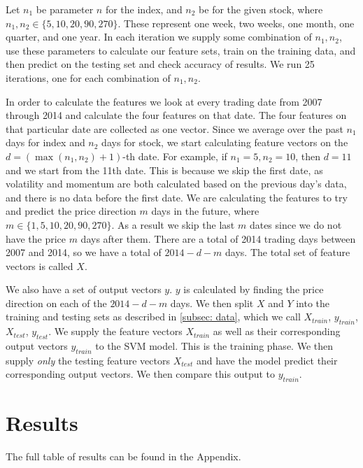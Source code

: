 \documentclass[pageno]{jpaper}
\begin{document}
Let $n_1$ be parameter $n$ for the index, and $n_2$ be for the given stock, where $n_1, n_2 \in \{5, 10, 20, 90, 270\}$. These represent one week, two weeks, one month, one quarter, and one year. In each iteration we supply some combination of $n_1, n_2$, use these parameters to calculate our feature sets, train on the training data, and then predict on the testing set and check accuracy of results. We run 25 iterations, one for each combination of $n_1, n_2$.

In order to calculate the features we look at every trading date from 2007 through 2014 and calculate the four features on that date. The four features on that particular date are collected as one vector. Since we average over the past $n_1$ days for index and $n_2$ days for stock, we start calculating feature vectors on the $d = (\max(n_1, n_2) + 1)$-th date. For example, if $n_1 = 5, n_2 = 10$, then $d=11$ and we start from the 11th date. This is because we skip the first date, as volatility and momentum are both calculated based on the previous day's data, and there is no data before the first date. We are calculating the features to try and predict the price direction $m$ days in the future, where $m \in \{1, 5, 10, 20, 90, 270\}$. As a result we skip the last $m$ dates since we do not have the price $m$ days after them. There are a total of 2014 trading days between 2007 and 2014, so we have a total of $2014 - d - m$ days. The total set of feature vectors is called $X$.

We also have a set of output vectors $y$. $y$ is calculated by finding the price direction on each of the $2014-d-m$ days. We then split $X$ and $Y$ into the training and testing sets as described in \ref{subsec: data}, which we call $X_{train}$, $y_{train}$, $X_{test}$, $y_{test}$. We supply the feature vectors $X_{train}$ as well as their corresponding output vectors $y_{train}$ to the SVM model. This is the training phase. We then supply {\em only} the testing feature vectors $X_{test}$ and have the model predict their corresponding output vectors. We then compare this output to $y_{train}$.

\section{Results}
\label{sec: results}
The full table of results can be found in the Appendix.


\end{document}
